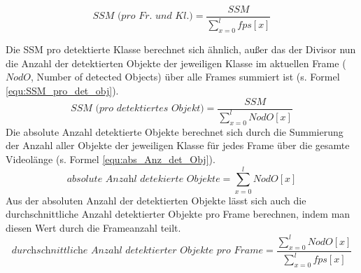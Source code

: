 {	\begin{equation} \label{equ:SSM_p_fr_u_kl}
		\textit{SSM (pro Fr. und Kl.)} = \frac{SSM }{ \sum_{x=0}^{l} \textit{fps}[x]}
	\end{equation}

	Die SSM pro detektierte Klasse berechnet sich ähnlich, außer das der Divisor nun die Anzahl der detektierten Objekte der jeweiligen Klasse im aktuellen Frame ($\textit{NodO}$, \glqq Number of detected Objects\grqq{}) über alle Frames summiert ist (s. Formel \ref{equ:SSM_pro_det_obj}).	 
	\begin{equation} \label{equ:SSM_pro_det_obj}
		\textit{SSM (pro detektiertes Objekt)} = \frac{SSM }{ \sum_{x=0}^{l} \textit{NodO}[x]}
	\end{equation} 
	Die absolute Anzahl detektierte Objekte berechnet sich durch die Summierung der Anzahl aller Objekte der jeweiligen Klasse für jedes Frame über die gesamte Videolänge (s. Formel \ref{equ:abs_Anz_det_Obj}). 
	\begin{equation} \label{equ:abs_Anz_det_Obj}
		\textit{absolute Anzahl detekierte Objekte} = { \sum_{x=0}^{l} \textit{NodO}[x]}
	\end{equation}
	Aus der absoluten Anzahl der detektierten Objekte lässt sich auch die durchschnittliche Anzahl detektierter Objekte pro Frame berechnen, indem man diesen Wert durch die Frameanzahl teilt.
	\begin{equation}
		\textit{durchschnittliche Anzahl detektierter Objekte pro Frame} = \frac{\sum_{x=0}^{l} \textit{NodO}[x]}{\sum_{x=0}^{l} \textit{fps}[x]} 
	\end{equation}

	
}
